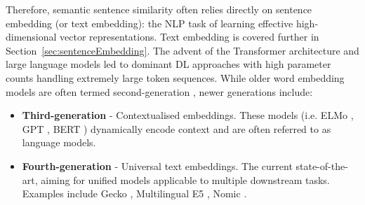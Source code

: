 \documentclass[10pt,oneside]{report}
\renewcommand{\citet}[1]{\citeauthor{#1}, \citeyear{#1}}
\begin{document}

Therefore, semantic sentence similarity often relies directly on sentence embedding (or text embedding): the NLP task of learning effective high-dimensional vector representations. Text embedding is covered further in Section~\ref{sec:sentenceEmbedding}. The advent of the Transformer architecture \cite{vaswani2017attention} and large language models led to dominant DL approaches with high parameter counts \cite{cao2024recent} handling extremely large token sequences. While older word embedding models are often termed second-generation \cite{cao2024recent}, newer generations include:

\begin{itemize}
    \item \textbf{Third-generation} - Contextualised embeddings. These models (i.e. ELMo \cite{sarzynska2021detecting}, GPT \cite{radford2018improving}, BERT \cite{devlin2019bert}) dynamically encode context and are often referred to as language models.
    \item \textbf{Fourth-generation} - Universal text embeddings. The current state-of-the-art, aiming for unified models applicable to multiple downstream tasks. Examples include Gecko \cite{lee2024gecko}, Multilingual E5 \cite{wang2024multilingual}, Nomic \cite{nussbaum2024nomic}.
\end{itemize}
\end{document}
